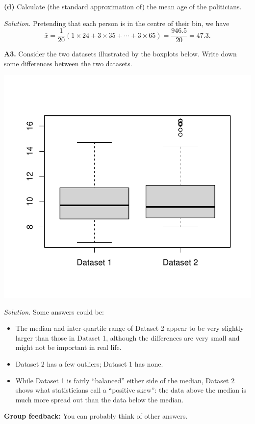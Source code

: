 \documentclass[
  a4paper,
]{book}
\providecommand{\tightlist}{%
  \setlength{\itemsep}{0pt}\setlength{\parskip}{0pt}}
\theoremstyle{definition}
\theoremstyle{definition}
\theoremstyle{definition}
\theoremstyle{definition}
\theoremstyle{remark}
\begin{document}
\textbf{(d)} Calculate (the standard approximation of) the mean age of the politicians.

\begin{myanswers}
\emph{Solution.} Pretending that each person is in the centre of their bin, we have
\[ \bar x = \frac{1}{20} (1\times24 + 3\times 35 + \cdots + 3 \times 65) = \frac{946.5}{20} = 47.3 . \]

\end{myanswers}

\textbf{A3.} Consider the two datasets illustrated by the boxplots below. Write down some differences between the two datasets.

\includegraphics{math1710_files/figure-latex/unnamed-chunk-25-1.pdf}

\begin{myanswers}
\emph{Solution.} Some answers could be:

\begin{itemize}
\tightlist
\item
  The median and inter-quartile range of Dataset 2 appear to be very slightly larger than those in Dataset 1, although the differences are very small and might not be important in real life.
\item
  Dataset 2 has a few outliers; Dataset 1 has none.
\item
  While Dataset 1 is fairly ``balanced'' either side of the median, Dataset 2 shows what statisticians call a ``positive skew'': the data above the median is much more spread out than the data below the median.
\end{itemize}

\textbf{Group feedback:}
You can probably think of other answers.

\end{myanswers}
\end{document}
